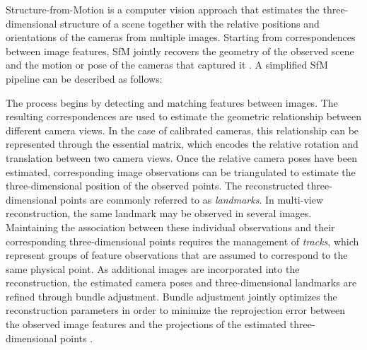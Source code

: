 Structure-from-Motion is a computer vision approach that estimates the three-dimensional structure of a scene together with the relative positions and orientations of the cameras from multiple images. Starting from correspondences between image features, SfM jointly recovers the geometry of the observed scene and the motion or pose of the cameras that captured it \cite{szeliski_computer_2022,schonberger_structure--motion_2016}.
A simplified SfM pipeline can be described as follows:

\begin{center}
\end{center}

The process begins by detecting and matching features between images. The resulting correspondences are used to estimate the geometric relationship between different camera views. In the case of calibrated cameras, this relationship can be represented through the essential matrix, which encodes the relative rotation and translation between two camera views. Once the relative camera poses have been estimated, corresponding image observations can be triangulated to estimate the three-dimensional position of the observed points. The reconstructed three-dimensional points are commonly referred to as \textit{landmarks}. In multi-view reconstruction, the same landmark may be observed in several images. Maintaining the association between these individual observations and their corresponding three-dimensional points requires the management of \textit{tracks}, which represent groups of feature observations that are assumed to correspond to the same physical point. As additional images are incorporated into the reconstruction, the estimated camera poses and three-dimensional landmarks are refined through bundle adjustment. Bundle adjustment jointly optimizes the reconstruction parameters in order to minimize the reprojection error between the observed image features and the projections of the estimated three-dimensional points \cite{szeliski_computer_2022}.

